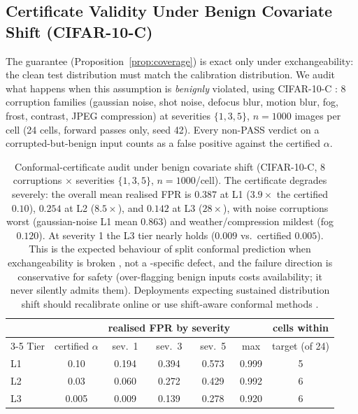 \subsection{Certificate Validity Under Benign Covariate Shift (CIFAR-10-C)}
\label{sec:cert_shift}

The \cadg guarantee (Proposition~\ref{prop:coverage}) is exact only under
exchangeability: the clean test distribution must match the calibration
distribution. We audit what happens when this assumption is \emph{benignly}
violated, using CIFAR-10-C \cite{hendrycks2019benchmarking}: 8 corruption
families (gaussian noise, shot noise, defocus blur, motion blur, fog, frost,
contrast, JPEG compression) at severities $\{1,3,5\}$, $n{=}1000$ images per
cell (24 cells, forward passes only, seed 42). Every non-PASS verdict on a
corrupted-but-benign input counts as a false positive against the certified
$\alpha$.

\begin{table}[h]
\centering
\small
\begin{tabular}{lcccccc}
\toprule
 & & \multicolumn{3}{c}{realised FPR by severity} & & cells within \\
\cmidrule(lr){3-5}
Tier & certified $\alpha$ & sev.\ 1 & sev.\ 3 & sev.\ 5 & max & target (of 24) \\
\midrule
L1 & 0.10  & 0.194 & 0.394 & 0.573 & 0.999 & 5 \\
L2 & 0.03  & 0.060 & 0.272 & 0.429 & 0.992 & 6 \\
L3 & 0.005 & 0.009 & 0.139 & 0.278 & 0.920 & 6 \\
\bottomrule
\end{tabular}
\caption{%
  Conformal-certificate audit under benign covariate shift (CIFAR-10-C,
  8 corruptions $\times$ severities $\{1,3,5\}$, $n{=}1000$/cell). The
  certificate degrades severely: the overall mean realised FPR is
  $0.387$ at L1 ($3.9\times$ the certified $0.10$), $0.254$ at L2
  ($8.5\times$), and $0.142$ at L3 ($28\times$), with noise corruptions
  worst (gaussian-noise L1 mean $0.863$) and weather/compression mildest
  (fog $0.120$). At severity 1 the L3 tier nearly holds ($0.009$ vs.\
  certified $0.005$). This is the expected behaviour of split conformal
  prediction when exchangeability is broken
  \cite{tibshirani2019conformal}, not a \prism-specific defect, and the
  failure direction is conservative for safety (over-flagging benign
  inputs costs availability; it never silently admits them). Deployments
  expecting sustained distribution shift should recalibrate online or use
  shift-aware conformal methods \cite{tibshirani2019conformal}.
}
\label{tab:cert_shift}
\end{table}

